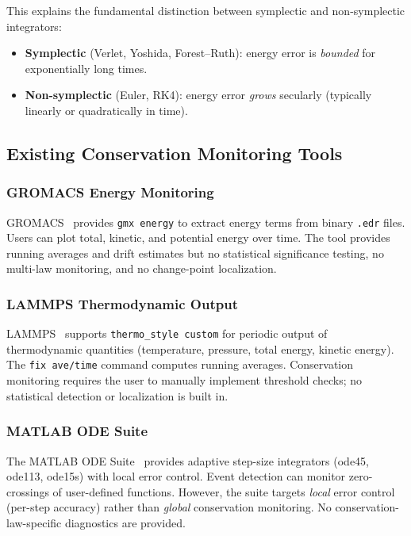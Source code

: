 \documentclass[11pt,a4paper]{article}
\begin{document}
This explains the fundamental distinction between symplectic and non-symplectic integrators:
\begin{itemize}
    \item \textbf{Symplectic} (Verlet, Yoshida, Forest--Ruth): energy error is \emph{bounded} for exponentially long times.
    \item \textbf{Non-symplectic} (Euler, RK4): energy error \emph{grows} secularly (typically linearly or quadratically in time).
\end{itemize}

\subsection{Existing Conservation Monitoring Tools}

\subsubsection{GROMACS Energy Monitoring}
GROMACS~\citep{abraham2015} provides \texttt{gmx energy} to extract energy terms from binary \texttt{.edr} files. Users can plot total, kinetic, and potential energy over time. The tool provides running averages and drift estimates but no statistical significance testing, no multi-law monitoring, and no change-point localization.

\subsubsection{LAMMPS Thermodynamic Output}
LAMMPS~\citep{thompson2022} supports \texttt{thermo\_style custom} for periodic output of thermodynamic quantities (temperature, pressure, total energy, kinetic energy). The \texttt{fix ave/time} command computes running averages. Conservation monitoring requires the user to manually implement threshold checks; no statistical detection or localization is built in.

\subsubsection{MATLAB ODE Suite}
The MATLAB ODE Suite~\citep{shampine1997} provides adaptive step-size integrators (ode45, ode113, ode15s) with local error control. Event detection can monitor zero-crossings of user-defined functions. However, the suite targets \emph{local} error control (per-step accuracy) rather than \emph{global} conservation monitoring. No conservation-law-specific diagnostics are provided.
\end{document}
